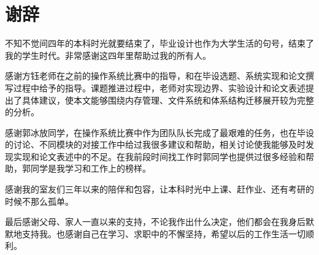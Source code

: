 \chapter*{谢辞}

不知不觉间四年的本科时光就要结束了，毕业设计也作为大学生活的句号，结束了我的学生时代。非常感谢这四年里帮助过我的所有人。

感谢方钰老师在之前的操作系统比赛中的指导，和在毕设选题、系统实现和论文撰写过程中给予的指导。课题推进过程中，老师对实现边界、实验设计和论文表述提出了具体建议，使本文能够围绕内存管理、文件系统和体系结构迁移展开较为完整的分析。

感谢郭冰放同学，在操作系统比赛中作为团队队长完成了最艰难的任务，也在毕设的讨论、不同模块的对接工作中给过我很多建议和帮助，相关讨论使我能够及时发现实现和论文表述中的不足。在我前段时间找工作时郭同学也提供过很多经验和帮助，郭同学是我学习和工作上的榜样。

感谢我的室友们三年以来的陪伴和包容，让本科时光中上课、赶作业、还有考研的时候不那么孤单。

最后感谢父母、家人一直以来的支持，不论我作出什么决定，他们都会在我身后默默地支持我。也感谢自己在学习、求职中的不懈坚持，希望以后的工作生活一切顺利。
